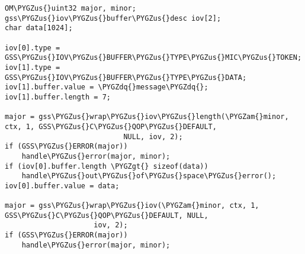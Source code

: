 \documentclass[letterpaper,10pt,english]{sphinxmanual}
\def\PYGZus{\char`\_}
\def\PYGZam{\char`\&}
\def\PYGZgt{\char`\>}
\def\PYGZdq{\char`\"}
\begin{document}
\begin{Verbatim}[commandchars=\\\{\}]
OM\PYGZus{}uint32 major, minor;
gss\PYGZus{}iov\PYGZus{}buffer\PYGZus{}desc iov[2];
char data[1024];

iov[0].type = GSS\PYGZus{}IOV\PYGZus{}BUFFER\PYGZus{}TYPE\PYGZus{}MIC\PYGZus{}TOKEN;
iov[1].type = GSS\PYGZus{}IOV\PYGZus{}BUFFER\PYGZus{}TYPE\PYGZus{}DATA;
iov[1].buffer.value = \PYGZdq{}message\PYGZdq{};
iov[1].buffer.length = 7;

major = gss\PYGZus{}wrap\PYGZus{}iov\PYGZus{}length(\PYGZam{}minor, ctx, 1, GSS\PYGZus{}C\PYGZus{}QOP\PYGZus{}DEFAULT,
                            NULL, iov, 2);
if (GSS\PYGZus{}ERROR(major))
    handle\PYGZus{}error(major, minor);
if (iov[0].buffer.length \PYGZgt{} sizeof(data))
    handle\PYGZus{}out\PYGZus{}of\PYGZus{}space\PYGZus{}error();
iov[0].buffer.value = data;

major = gss\PYGZus{}wrap\PYGZus{}iov(\PYGZam{}minor, ctx, 1, GSS\PYGZus{}C\PYGZus{}QOP\PYGZus{}DEFAULT, NULL,
                     iov, 2);
if (GSS\PYGZus{}ERROR(major))
    handle\PYGZus{}error(major, minor);
\end{Verbatim}
\end{document}
